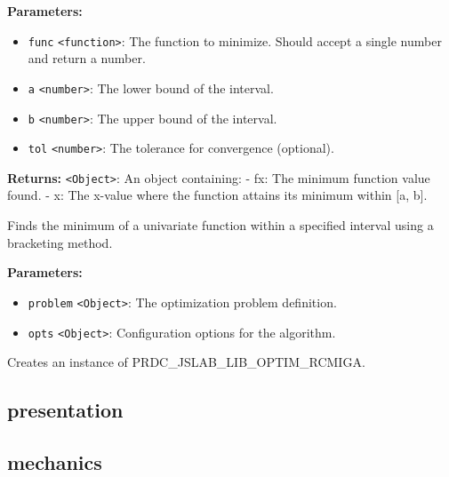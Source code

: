 \documentclass[12pt,a4paper]{article}
\begin{document}
\noindent \textbf{Parameters:}
\begin{itemize}
  \item \texttt{func} \texttt{<function>}: The function to minimize. Should accept a single number and return a number.
  \item \texttt{a} \texttt{<number>}: The lower bound of the interval.
  \item \texttt{b} \texttt{<number>}: The upper bound of the interval.
  \item \texttt{tol} \texttt{<number>}: The tolerance for convergence (optional).
\end{itemize}

\noindent \textbf{Returns:} \texttt{<Object>}: An object containing:
  - \textasciigrave{}fx\textasciigrave{}: The minimum function value found.
  - \textasciigrave{}x\textasciigrave{}: The x-value where the function attains its minimum within [a, b].

\noindent Finds the minimum of a univariate function within a specified interval using a bracketing method.

\vspace{5mm}
\noindent {}


\noindent \textbf{Parameters:}
\begin{itemize}
  \item \texttt{problem} \texttt{<Object>}: The optimization problem definition.
  \item \texttt{opts} \texttt{<Object>}: Configuration options for the algorithm.
\end{itemize}

\noindent Creates an instance of PRDC\_JSLAB\_LIB\_OPTIM\_RCMIGA.


\subsection{presentation}

\subsection{mechanics}
\vspace{5mm}
\noindent {}
\end{document}

